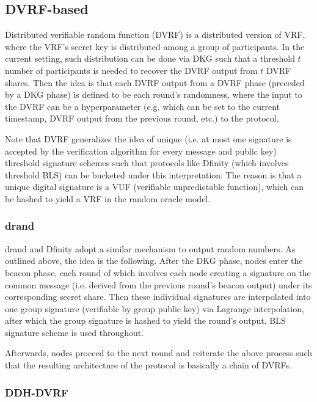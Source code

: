 \documentclass[letterpaper,twocolumn,10pt]{article}
\theoremstyle{definition}
\theoremstyle{remark}
\begin{document}
\subsection{DVRF-based}
Distributed verifiable random function (DVRF) is a distributed version of VRF, where the VRF's secret key is distributed among a group of participants. In the current setting, such distribution can be done via DKG such that a threshold $t$ number of participants is needed to recover the DVRF output from $t$ DVRF shares. Then the idea is that each DVRF output from a DVRF phase (preceded by a DKG phase) is defined to be each round's randomness, where the input to the DVRF can be a hyperparameter (e.g. which can be set to the current timestamp, DVRF output from the previous round, etc.) to the protocol.

Note that DVRF generalizes the idea of unique (i.e. at most one signature is accepted by the verification algorithm for every message and public key) threshold signature schemes such that protocols like Dfinity (which involves threshold BLS) can be bucketed under this interpretation. The reason is that a unique digital signature is a VUF (verifiable unpredictable function), which can be hashed to yield a VRF in the random oracle model.

\subsubsection{drand}
drand and Dfinity adopt a similar mechanism to output random numbers. As outlined above, the idea is the following. After the DKG phase, nodes enter the beacon phase, each round of which involves each node creating a signature on the common message (i.e. derived from the previous round's beacon output) under its corresponding secret share. Then these individual signatures are interpolated into one group signature (verifiable by group public key) via Lagrange interpolation, after which the group signature is hashed to yield the round's output. BLS signature scheme is used throughout.

Afterwards, nodes proceed to the next round and reiterate the above process such that the resulting architecture of the protocol is basically a chain of DVRFs.

\subsubsection{DDH-DVRF}
\end{document}
